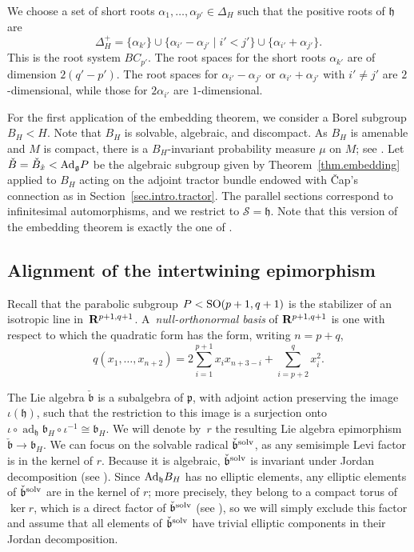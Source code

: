 \documentclass[pdftex]{sigma}
\numberwithin{equation}{section}
\theoremstyle{definition}
\newcommand{\BR}{{\bf R}}
\newcommand{\lieg}{\mathfrak{g}}
\newcommand{\lieh}{\mathfrak{h}}
\def\h{{\mathfrak h}}
\def\p{{\mathfrak p}}
\def\b{{\mathfrak b}}
\newcommand{\SO}{{\rm SO}}
\begin{document}
We choose a set of short roots $\alpha_1, \dots, \alpha_{p'} \in \Delta_H$ such that the positive roots of $\lieh$ are
\[ \Delta_H^+ = \{ \alpha_{k'} \} \cup \{ \alpha_{i'} - \alpha_{j'} \mid i' < j' \} \cup \{ \alpha_{i'} + \alpha_{j'} \} .\]
This is the root system $BC_{p'}$. The root spaces for the short roots $\alpha_{k'}$ are of dimension $2(q'-p')$. The root spaces for $\alpha_{i'} - \alpha_{j'}$ or $\alpha_{i'} + \alpha_{j'}$ with $i' \neq j'$ are $2$-dimensional, while those for $2 \alpha_{i'}$ are $1$-dimensional.

For the first application of the embedding theorem, we consider a Borel subgroup $B_H < H$. Note that $B_H$ is solvable, algebraic, and discompact. As $B_H$ is amenable and $M$ is compact, there is a $B_H$-invariant probability measure $\mu$ on $M$; see \cite[Definition~4.1.1 and Corollary~4.1.7]{zimmer.etsg}.
Let $\check{B} = \check{B}_{\hat{x}} < {\rm Ad}_\lieg P$ be the algebraic subgroup given by Theorem~\ref{thm.embedding} applied to $B_H$ acting on the adjoint tractor bundle endowed with \v{C}ap's connection as in Section~\ref{sec.intro.tractor}. The parallel sections correspond to infinitesimal automorphisms, and we restrict to $\mathcal{S} = \lieh$. Note that this version of the embedding theorem is exactly the one of \cite{bfm.zimemb}.

\subsection{Alignment of the intertwining epimorphism}
\label{subsec.alignment}

Recall that the parabolic subgroup $P < \SO(p+1,q+1)$ is the stabilizer of an isotropic line in~$\BR^{p+1,q+1}$. A~\emph{null-orthonormal basis} of $\BR^{p+1,q+1}$ is one with respect to which the quadratic form has the form, writing $n=p+q$,
\[q(x_1, \dots, x_{n+2}) = 2 \sum_{i=1}^{p+1} x_i x_{n+3-i} + \sum_{i=p+2}^{q} x_i^2.\]

The Lie algebra $\check{\b}$ is a subalgebra of $\p$, with adjoint action preserving the image $\iota(\lieh)$, such that the restriction to this image is a surjection onto $\iota \circ \operatorname{ad}_\lieh \b_H \circ \iota^{-1} \cong \b_H$.
We will denote by~$r$ the resulting Lie algebra epimorphism $\check{\b} \rightarrow \b_H$.
We can focus on the solvable radical $\check{\b}^{\rm solv}$, as any semisimple Levi factor is in the kernel of $r$. Because it is algebraic, $\check{\b}^{\rm solv}$ is invariant under Jordan decomposition (see \cite[Theorem~4.3.3]{morris.ratners.thms.book}). Since ${\rm Ad}_\h B_H$ has no elliptic elements, any elliptic elements of $\check{\b}^{\rm solv}$ are in the kernel of $r$; more precisely, they belong to a compact torus of $\ker r$, which is a direct factor of $\check{\b}^{\rm solv}$ (see \cite[Theorem~4.4.7 and Corollary 4.4.12]{morris.ratners.thms.book}), so we will simply exclude this factor and assume that all elements of $\check{\b}^{\rm solv}$ have trivial elliptic components in their Jordan decomposition.
\end{document}
